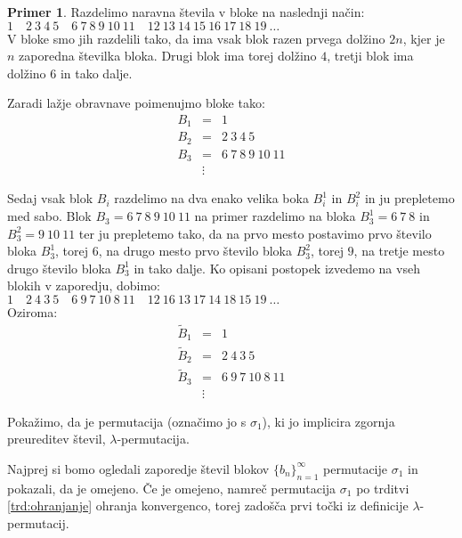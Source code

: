 \documentclass[12pt,a4paper,reqno]{amsart}
\theoremstyle{definition} %
\newtheorem{primer}[definicija]{Primer}
\theoremstyle{plain} %
\begin{document}
\begin{primer}\label{pr:1}
Razdelimo naravna števila v bloke na naslednji način:\\

$1 \quad 2\: 3\: 4\: 5 \quad 6\: 7\: 8\: 9\: 10\: 11 \quad 12\: 13\: 14\: 15\: 16\: 17\: 18\: 19\: \ldots $\\

V bloke smo jih razdelili tako, da ima vsak blok razen prvega dolžino $2n$, kjer je $n$ zaporedna številka bloka. Drugi blok ima torej dolžino $4$, tretji blok ima dolžino $6$ in tako dalje.

Zaradi lažje obravnave poimenujmo bloke tako:
\begin{eqnarray*}
B_1&=& 1\\
B_2&=& 2\: 3\: 4\: 5\\
B_3&=& 6\: 7\: 8\: 9\: 10\: 11\\
&\vdots &
\end{eqnarray*}

Sedaj vsak blok $B_i$ razdelimo na dva enako velika boka $B_i^1$ in $B_i^2$ in ju prepletemo med sabo. Blok $B_3=6\: 7\: 8\: 9\: 10\: 11$ na primer razdelimo na bloka $B_3^1=6\: 7\: 8$ in $B_3^2=9\: 10\: 11$ ter ju prepletemo tako, da na prvo mesto postavimo prvo število bloka $B_3^1$, torej $6$, na drugo mesto prvo število bloka $B_3^2$, torej $9$, na tretje mesto drugo število bloka $B_3^1$ in tako dalje. Ko opisani postopek izvedemo na vseh blokih v zaporedju, dobimo:\\ 

$1 \quad 2\: 4\: 3\: 5 \quad 6\: 9\: 7\: 10\: 8\: 11 \quad 12\: 16\: 13\: 17\: 14\: 18\: 15\: 19\: \ldots $\\

Oziroma:
\begin{eqnarray*}
\tilde{B}_1&=& 1\\
\tilde{B}_2&=& 2\: 4\: 3\: 5\\
\tilde{B}_3&=& 6\: 9\: 7\: 10\: 8\: 11\\
&\vdots &
\end{eqnarray*}

Pokažimo, da je permutacija (označimo jo s $\sigma_1$), ki jo implicira zgornja preureditev števil, $\lambda$-permutacija.

Najprej si bomo ogledali zaporedje števil blokov $\{b_n\}_{n=1}^{\infty}$ permutacije $\sigma_1$ in pokazali, da je omejeno. Če je omejeno, namreč permutacija $\sigma_1$ po trditvi \ref{trd:ohranjanje} ohranja konvergenco, torej zadošča prvi točki iz definicije $\lambda$-permutacij. 


\end{primer}
\end{document}
